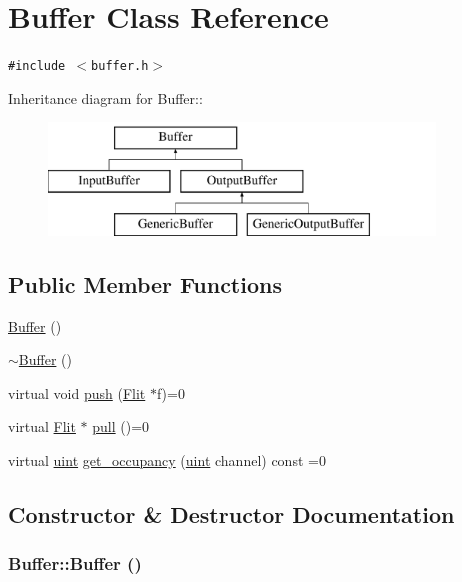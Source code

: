 \hypertarget{classBuffer}{
\section{Buffer Class Reference}
\label{classBuffer}
}
{\tt \#include $<$buffer.h$>$}

Inheritance diagram for Buffer::\begin{figure}[H]
\begin{center}
\leavevmode
\includegraphics[height=3cm]{classBuffer}
\end{center}
\end{figure}
\subsection*{Public Member Functions}
\begin{CompactItemize}
\item 
\hyperlink{classBuffer_e7ef2cd201190fde551dcb902627112b}{Buffer} ()
\item 
\hyperlink{classBuffer_59b8743e4a5f731bdd0c4185c9ef263b}{$\sim$Buffer} ()
\item 
virtual void \hyperlink{classBuffer_c9dce1860c655146f000df30314caaa9}{push} (\hyperlink{classFlit}{Flit} $\ast$f)=0
\item 
virtual \hyperlink{classFlit}{Flit} $\ast$ \hyperlink{classBuffer_95f5c230f9c261bc13ddcfafcc340e7e}{pull} ()=0
\item 
virtual \hyperlink{outputBuffer_8h_91ad9478d81a7aaf2593e8d9c3d06a14}{uint} \hyperlink{classBuffer_af4e2d4031945429ae58350b5897570a}{get\_\-occupancy} (\hyperlink{outputBuffer_8h_91ad9478d81a7aaf2593e8d9c3d06a14}{uint} channel) const =0
\end{CompactItemize}


\subsection{Constructor \& Destructor Documentation}
\hypertarget{classBuffer_e7ef2cd201190fde551dcb902627112b}{
\subsubsection[{Buffer}]{\setlength{\rightskip}{0pt plus 5cm}Buffer::Buffer ()}}
\label{classBuffer_e7ef2cd201190fde551dcb902627112b}


